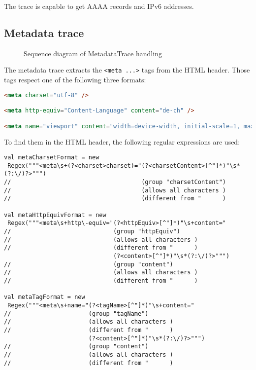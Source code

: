 \documentclass[
	a4paper,					10pt,							twoside,					openright,				notitlepage,			parskip=half,			]{scrreprt}
\begin{document}
The trace is capable to get AAAA records and IPv6 addresses.

\subsection{Metadata trace}
\label{subsec:api_libstruct_metadata}

\begin{figure}[H] 
\caption{Sequence diagram of MetadataTrace handling}
\label{fig:seq-metadatatrace}
\end{figure}

The metadata trace extracts the \verb|<meta ...>| tags from the \gls{HTML} header. Those tags respect one of the following
three formats: 

\begin{lstlisting}[language={HTML}]
<meta charset="utf-8" />

<meta http-equiv="Content-Language" content="de-ch" />

<meta name="viewport" content="width=device-width, initial-scale=1, maximum-scale=1">

\end{lstlisting}

To find them in the \gls{HTML} header, the following regular expressions are used:

\begin{lstlisting}[language={}]
val metaCharsetFormat = new
 Regex("""<meta\s+(?<charset>charset)="(?<charsetContent>[^"]*)"\s*(?:\/)?>""")   
//                                     (group "charsetContent")
//                                     (allows all characters )
//                                     (different from "      )

val metaHttpEquivFormat = new
 Regex("""<meta\s+http\-equiv="(?<httpEquiv>[^"]*)"\s+content="                   
//                             (group "httpEquiv")
//                             (allows all characters )
//                             (different from "      )
                               (?<content>[^"]*)"\s*(?:\/)?>""")                
//                             (group "content")
//                             (allows all characters )
//                             (different from "      )

val metaTagFormat = new
 Regex("""<meta\s+name="(?<tagName>[^"]*)"\s+content="                            
//                      (group "tagName")
//                      (allows all characters )
//                      (different from "      )
                        (?<content>[^"]*)"\s*(?:\/)?>""")                       
//                      (group "content")
//                      (allows all characters )
//                      (different from "      )

\end{lstlisting}
\end{document}
